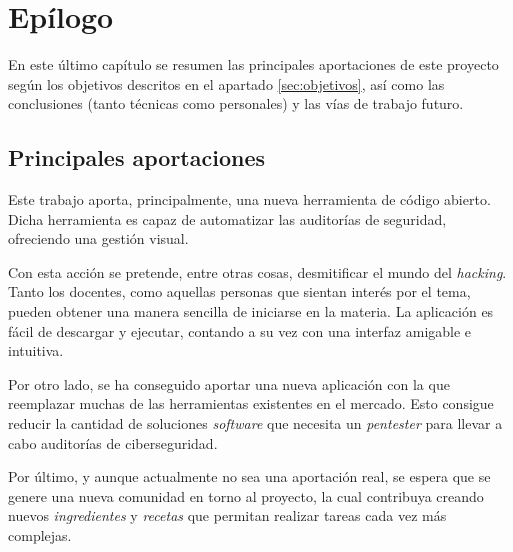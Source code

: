 

\chapter{Epílogo} \label{cap:ending}

En este último capítulo se resumen las principales aportaciones de este proyecto según los objetivos descritos en el apartado \ref{sec:objetivos}, así como las conclusiones (tanto técnicas como personales) y las vías de trabajo futuro.\n


\section{Principales aportaciones} \label{sec:contributions}

Este trabajo aporta, principalmente, una nueva herramienta de código abierto. Dicha herramienta es capaz de automatizar las auditorías de seguridad, ofreciendo una gestión visual.\sn

Con esta acción se pretende, entre otras cosas, desmitificar el mundo del \textit{hacking}. Tanto los docentes, como aquellas personas que sientan interés por el tema, pueden obtener una manera sencilla de iniciarse en la materia. La aplicación es fácil de descargar y ejecutar, contando a su vez con una interfaz amigable e intuitiva.\sn

Por otro lado, se ha conseguido aportar una nueva aplicación con la que reemplazar muchas de las herramientas existentes en el mercado. Esto consigue reducir la cantidad de soluciones \textit{software} que necesita un \textit{pentester} para llevar a cabo auditorías de ciberseguridad.\sn

Por último, y aunque actualmente no sea una aportación real, se espera que se genere una nueva comunidad en torno al proyecto, la cual contribuya creando nuevos \textit{ingredientes} y \textit{recetas} que permitan realizar tareas cada vez más complejas.\n


